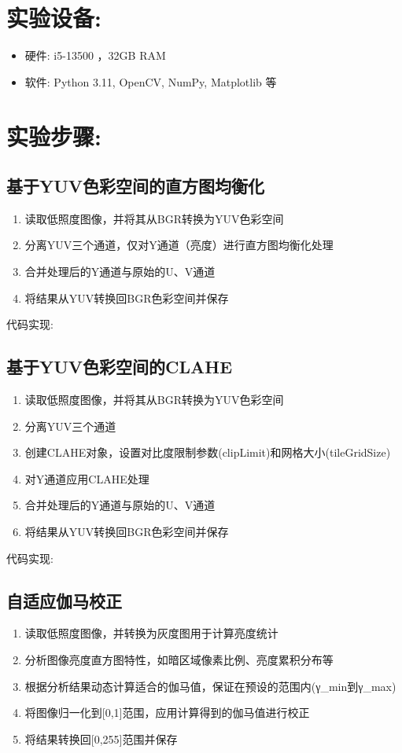 \documentclass[a4paper,11pt,UTF8]{ctexart}
\begin{document}
\section{实验设备:}
\begin{itemize}
    \item 硬件: i5-13500 ，32GB RAM
    \item 软件: Python 3.11, OpenCV, NumPy, Matplotlib 等
\end{itemize}

\section{实验步骤:}
\subsection{基于YUV色彩空间的直方图均衡化}
\begin{enumerate}
    \item 读取低照度图像，并将其从BGR转换为YUV色彩空间
    \item 分离YUV三个通道，仅对Y通道（亮度）进行直方图均衡化处理
    \item 合并处理后的Y通道与原始的U、V通道
    \item 将结果从YUV转换回BGR色彩空间并保存
\end{enumerate}

代码实现:


\subsection{基于YUV色彩空间的CLAHE}
\begin{enumerate}
    \item 读取低照度图像，并将其从BGR转换为YUV色彩空间
    \item 分离YUV三个通道
    \item 创建CLAHE对象，设置对比度限制参数(clipLimit)和网格大小(tileGridSize)
    \item 对Y通道应用CLAHE处理
    \item 合并处理后的Y通道与原始的U、V通道
    \item 将结果从YUV转换回BGR色彩空间并保存
\end{enumerate}

代码实现:


\subsection{自适应伽马校正}
\begin{enumerate}
    \item 读取低照度图像，并转换为灰度图用于计算亮度统计
    \item 分析图像亮度直方图特性，如暗区域像素比例、亮度累积分布等
    \item 根据分析结果动态计算适合的伽马值，保证在预设的范围内(γ\_min到γ\_max)
    \item 将图像归一化到[0,1]范围，应用计算得到的伽马值进行校正
    \item 将结果转换回[0,255]范围并保存
\end{enumerate}
\end{document}
